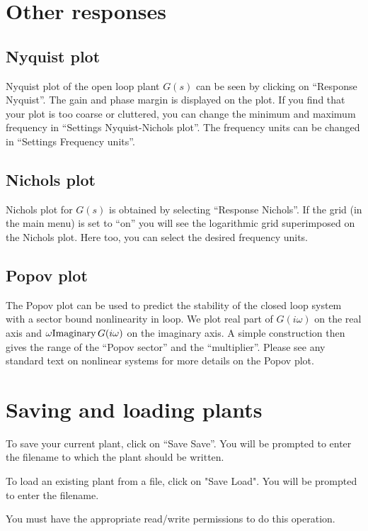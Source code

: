 \section{Other responses}
\subsection{Nyquist plot} 
Nyquist plot of the open loop plant $G(s)$ can be seen by clicking on
``Response \rar Nyquist''. The gain and phase margin is displayed on the
plot. If you find that your plot is too coarse or cluttered, you can
change the minimum and maximum frequency in
``Settings \rar Nyquist-Nichols plot''. The frequency units can be
changed in ``Settings \rar Frequency units''. 

\subsection{Nichols plot}
Nichols plot for $G(s)$ is obtained by selecting
``Response \rar Nichols''. If the grid (in the main menu) is set to
``on'' you will see the logarithmic grid superimposed on the Nichols
plot. Here too, you can select the desired frequency units. 
\subsection{Popov plot}
The Popov plot can be used to predict the stability of the closed loop
system with a sector bound nonlinearity in loop. We plot real part of
$G(i\omega)$ on the real axis and $\omega {\rm Imaginary} \,
G(i\omega)$  on the imaginary axis. A simple construction then gives
the range of the ``Popov sector'' and the ``multiplier''. Please see
any standard text on nonlinear systems for more details on the Popov
plot. 

\section{Saving and loading plants}
To save your current plant, click on ``Save \rar Save''. You will be
prompted to enter the filename to which the plant should be written. 

To load an existing plant from a file, click on "Save \rar Load". You will be
prompted to enter the filename.  

You must have the appropriate read/write permissions to do this
operation. 
